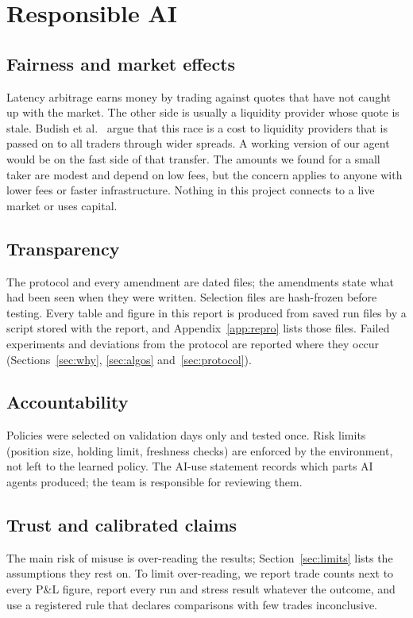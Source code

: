 \documentclass[12pt,a4paper]{article}
\begin{document}
\section{Responsible AI}\label{sec:rai}

\subsection{Fairness and market effects}
Latency arbitrage earns money by trading against quotes that have not caught up with the
market. The other side is usually a liquidity provider whose quote is stale. Budish et
al.~\cite{budish} argue that this race is a cost to liquidity providers that is passed on to
all traders through wider spreads. A working version of our agent would be on the fast side of
that transfer. The amounts we found for a small taker are modest and depend on low fees, but
the concern applies to anyone with lower fees or faster infrastructure. Nothing in this
project connects to a live market or uses capital.

\subsection{Transparency}
The protocol and every amendment are dated files; the amendments state what had been seen when
they were written. Selection files are hash-frozen before testing. Every table and figure in
this report is produced from saved run files by a script stored with the report, and
Appendix~\ref{app:repro} lists those files. Failed experiments and deviations from the protocol
are reported where they occur (Sections~\ref{sec:why}, \ref{sec:algos} and~\ref{sec:protocol}).

\subsection{Accountability}
Policies were selected on validation days only and tested once. Risk limits (position
size, holding limit, freshness checks) are enforced by the environment, not left to the learned
policy. The AI-use statement records which parts AI agents produced; the team is responsible
for reviewing them.

\subsection{Trust and calibrated claims}
The main risk of misuse is over-reading the results; Section~\ref{sec:limits} lists the
assumptions they rest on. To limit over-reading, we report trade counts next to every P\&L
figure, report every run and stress result whatever the outcome, and use a registered rule
that declares comparisons with few trades inconclusive.
\end{document}
